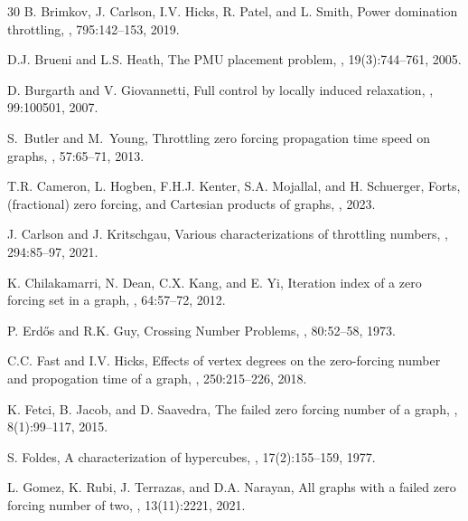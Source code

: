 \documentclass[twoside, 12pt]{article}
\theoremstyle{definition}
\begin{document}
\begin{thebibliography}{30}
{\sc B. Brimkov, J. Carlson, I.V. Hicks, R. Patel, and L. Smith},
\newblock Power domination throttling,
, 795:142--153, 2019. 

{\sc D.J. Brueni and L.S. Heath},
\newblock The {PMU} placement problem,
, 19(3):744--761, 2005.

{\sc D. Burgarth and V. Giovannetti},
\newblock Full control by locally induced relaxation,
, 99:100501, 2007.

{\sc S.~Butler and M.~Young},
\newblock Throttling zero forcing propagation time speed on graphs,
, 57:65--71, 2013. 

{\sc T.R. Cameron, L. Hogben, F.H.J. Kenter, S.A. Mojallal, and H. Schuerger},
\newblock Forts, (fractional) zero forcing, and Cartesian products of graphs,
, 2023.

{\sc J. Carlson and J. Kritschgau},
\newblock Various characterizations of throttling numbers,
, 294:85--97, 2021.

{\sc K. Chilakamarri, N. Dean, C.X. Kang, and E. Yi},
\newblock Iteration index of a zero forcing set in a graph,
, 64:57--72, 2012. 

{\sc P. Erd\H os and R.K. Guy},
\newblock Crossing Number Problems,
, 80:52--58, 1973.

{\sc C.C. Fast and I.V. Hicks},
\newblock Effects of vertex degrees on the zero-forcing number and
propogation time of a graph,
, 250:215--226, 2018.

{\sc K. Fetci, B. Jacob, and D. Saavedra},
\newblock The failed zero forcing number of a graph,
, 8(1):99--117, 2015.

{\sc S. Foldes},
\newblock A characterization of hypercubes,
, 17(2):155--159, 1977.

{\sc L. Gomez, K. Rubi, J. Terrazas, and D.A. Narayan},
\newblock All graphs with a failed zero forcing number of two,
, 13(11):2221, 2021. 


\end{thebibliography}
\end{document}
